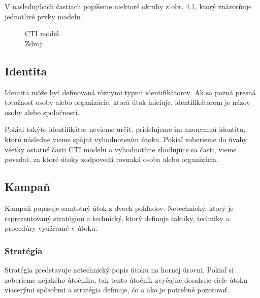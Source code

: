 \documentclass[12pt, a4paper, oneside]{book}
\begin{document}
V nasledujúcich častiach popíšeme niektoré okruhy z obr. 4.1, ktorý znázorňuje jednotlivé prvky modelu.


\begin{figure}
\label{fig:semantic_web}
\caption{CTI model.\\Zdroj: \citep{MavroeidisB17}}

\end{figure}

\subsection{Identita}
Identita môže byť definovaná rôznymi typmi identifikátorov. Ak sa pozná presná totožnosť osoby alebo organizácie, ktorá útok iniciuje, identifikátorom je názov osoby alebo spoločnosti.


Pokiaľ takýto identifikátor nevieme určiť, prideľujeme im anonymnú identitu, ktorú následne vieme spájať vyhodnotením útoku. Pokiaľ zoberieme do úvahy všetky ostatné časti CTI modelu a vyhodnotíme zhodujúce sa časti, vieme povedať, za ktoré útoky zodpovedá rovnaká osoba alebo organizácia.



\subsection{Kampaň}
Kampaň popisuje samtotný útok z dvoch pohľadov. Netechnický, ktorý je reprezentovaný stratégiou a technický, ktorý definuje taktiky, techniky a procedúry využívané v útoku.

\subsubsection{Stratégia}
Stratégia predstavuje netechnický popis útoku na hornej úrovni. Pokiaľ si zoberieme nejakého útočníka, tak tento útočník zvyčajne dosahuje ciele útoku viacerými spôsobmi a stratégia definuje, čo a ako je potrebné pozorovať.
\end{document}
